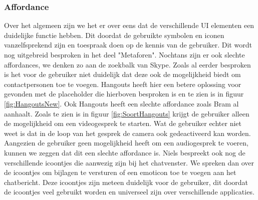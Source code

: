 \documentclass[11pt]{article}
\begin{document}
\subsubsection{Affordance} 
Over het algemeen zijn we het er over eens dat de verschillende UI elementen een duidelijke functie hebben. Dit doordat de gebruikte symbolen en iconen vanzelfsprekend zijn en toespraak doen op de kennis van de gebruiker. Dit wordt nog uitgebreid besproken in het deel "Metaforen". 
\newline
Nochtans zijn er ook slechte affordances, we denken zo aan de zoekbalk van Skype. Zoals al eerder besproken is het voor de gebruiker niet duidelijk dat deze ook de mogelijkheid biedt om contactpersonen toe te voegen. Hangouts heeft hier een betere oplossing voor gevonden met de placeholder die hierboven besproken is en te zien is in figuur \ref{fig:HangoutsNew}.
\newline
Ook Hangouts heeft een slechte affordance zoals Bram al aanhaalt. Zoals te zien is in figuur \ref{fig:SoortHangouts} krijgt de gebruiker alleen de mogelijkheid om een videogesprek te starten. Wat de gebruiker echter niet weet is dat in de loop van het gesprek de camera ook gedeactiveerd kan worden. Aangezien de gebruiker geen mogelijkheid heeft om een audiogesprek te voeren, kunnen we zeggen dat dit een slechte affordance is. 
\newline  
Niels bespreekt ook nog de verschillende icoontjes die aanwezig zijn bij het chatvenster. We spreken dan over de icoontjes om bijlagen te versturen of een emoticon toe te voegen aan het chatbericht. Deze icoontjes zijn meteen duidelijk voor de gebruiker, dit doordat de icoontjes veel gebruikt worden en universeel zijn over verschillende applicaties.
\end{document}
